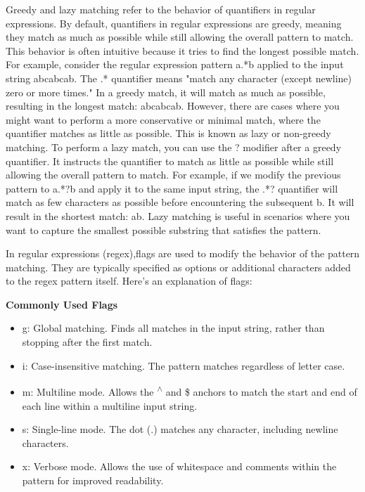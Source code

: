 \documentclass{report}
\begin{document}
    Greedy and lazy matching refer to the behavior of quantifiers in regular expressions.
    \bigbreak \noindent 
    By default, quantifiers in regular expressions are greedy, meaning they match as much as possible while still allowing the overall pattern to match. This behavior is often intuitive because it tries to find the longest possible match.
    \bigbreak \noindent 
    For example, consider the regular expression pattern a.*b applied to the input string abcabcab. The .* quantifier means "match any character (except newline) zero or more times." In a greedy match, it will match as much as possible, resulting in the longest match: abcabcab.
    \bigbreak \noindent 
    However, there are cases where you might want to perform a more conservative or minimal match, where the quantifier matches as little as possible. This is known as lazy or non-greedy matching.
    \bigbreak \noindent 
    To perform a lazy match, you can use the ? modifier after a greedy quantifier. It instructs the quantifier to match as little as possible while still allowing the overall pattern to match.
    \bigbreak \noindent 
    For example, if we modify the previous pattern to a.*?b and apply it to the same input string, the .*? quantifier will match as few characters as possible before encountering the subsequent b. It will result in the shortest match: ab.
    \bigbreak \noindent 
    Lazy matching is useful in scenarios where you want to capture the smallest possible substring that satisfies the pattern.
    \bigbreak \noindent 

    \pagebreak
    \bigbreak
    \noindent

    \bigbreak \noindent 
    In regular expressions (regex),flags are used to modify the behavior of the pattern matching. They are typically specified as options or additional characters added to the regex pattern itself. Here's an explanation of flags:

    \bigbreak \noindent 
    \textbf{Commonly Used Flags}
    \begin{itemize}
        \item g: Global matching. Finds all matches in the input string, rather than stopping after the first match.
        \item i: Case-insensitive matching. The pattern matches regardless of letter case.
        \item m: Multiline mode. Allows the \textsuperscript{$\wedge$} and \$ anchors to match the start and end of each line within a multiline input string.
        \item s: Single-line mode. The dot (.) matches any character, including newline characters.
        \item x: Verbose mode. Allows the use of whitespace and comments within the pattern for improved readability.
    \end{itemize}
\end{document}
